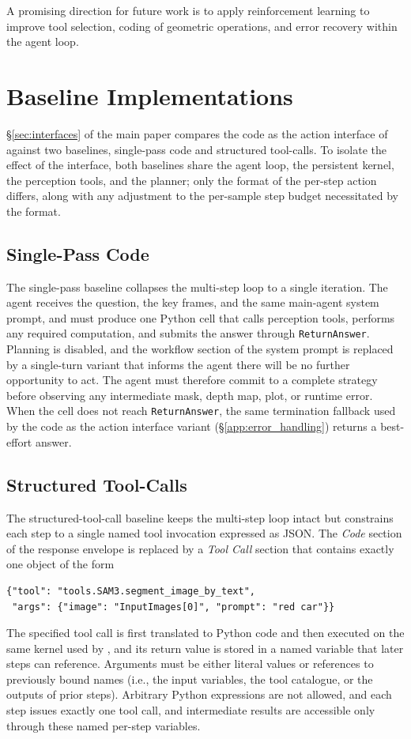 A promising direction for future work is to apply reinforcement learning to improve tool selection, coding of geometric operations, and error recovery within the agent loop.

\section{Baseline Implementations}
\label{app:baselines}

\S\ref{sec:interfaces} of the main paper compares the code as the action interface of \ours{} against two baselines, single-pass code and structured tool-calls. To isolate the effect of the interface, both baselines share the agent loop, the persistent kernel, the perception tools, and the planner; only the format of the per-step action differs, along with any adjustment to the per-sample step budget necessitated by the format.

\subsection{Single-Pass Code}
\label{app:baseline_single_pass}
The single-pass baseline collapses the multi-step loop to a single iteration. The agent receives the question, the key frames, and the same main-agent system prompt, and must produce one Python cell that calls perception tools, performs any required computation, and submits the answer through \texttt{ReturnAnswer}. Planning is disabled, and the workflow section of the system prompt is replaced by a single-turn variant that informs the agent there will be no further opportunity to act. The agent must therefore commit to a complete strategy before observing any intermediate mask, depth map, plot, or runtime error. When the cell does not reach \texttt{ReturnAnswer}, the same termination fallback used by the code as the action interface variant (\S\ref{app:error_handling}) returns a best-effort answer.

\subsection{Structured Tool-Calls}
\label{app:baseline_react}
The structured-tool-call baseline keeps the multi-step loop intact but constrains each step to a single named tool invocation expressed as JSON. The \emph{Code} section of the response envelope is replaced by a \emph{Tool Call} section that contains exactly one object of the form
\begin{lstlisting}[style=promptStyle]
{"tool": "tools.SAM3.segment_image_by_text",
 "args": {"image": "InputImages[0]", "prompt": "red car"}}
\end{lstlisting}
The specified tool call is first translated to Python code and then executed on the same kernel used by \ours{}, and its return value is stored in a named variable that later steps can reference. Arguments must be either literal values or references to previously bound names (i.e., the input variables, the tool catalogue, or the outputs of prior steps).
Arbitrary Python expressions are not allowed, and each step issues exactly one tool call, and intermediate results are accessible only through these named per-step variables.


